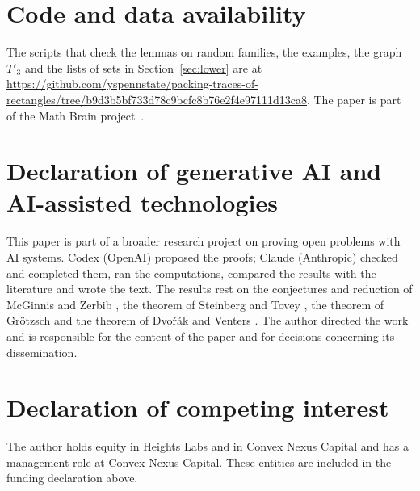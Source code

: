 \documentclass[11pt]{article}
\theoremstyle{remark}
\begin{document}
\section*{Code and data availability}
The scripts that check the lemmas on random families, the examples, the graph $T'_3$ and the lists of sets in Section~\ref{sec:lower} are at \url{https://github.com/yspennstate/packing-traces-of-rectangles/tree/b9d3b5bf733d78c9bcfc8b76e2f4e97111d13ca8}. The paper is part of the Math Brain project~\cite{MathBrainRepo}.

\section*{Declaration of generative AI and AI-assisted technologies}
This paper is part of a broader research project on proving open problems with AI systems. Codex (OpenAI) proposed the proofs; Claude (Anthropic) checked and completed them, ran the computations, compared the results with the literature and wrote the text. The results rest on the conjectures and reduction of McGinnis and Zerbib \cite{MZ}, the theorem of Steinberg and Tovey \cite{ST}, the theorem of Gr\"otzsch \cite{G} and the theorem of Dvo\v{r}\'ak and Venters \cite{DV}. The author directed the work and is responsible for the content of the paper and for decisions concerning its dissemination.

\section*{Declaration of competing interest}
The author holds equity in Heights Labs and in Convex Nexus Capital and has a management role at Convex Nexus Capital. These entities are included in the funding declaration above.
\end{document}
